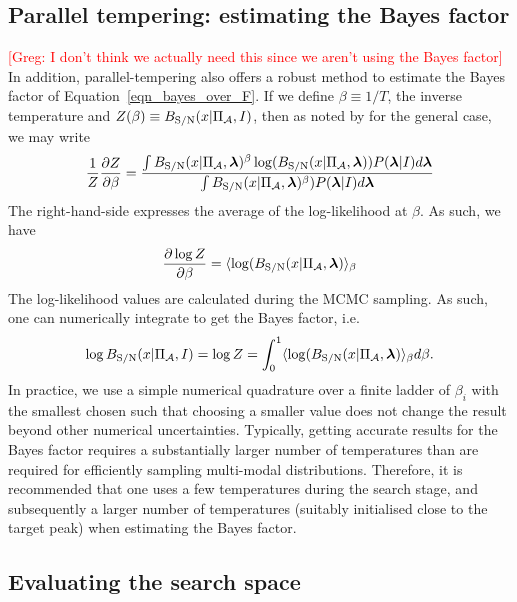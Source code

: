 \documentclass[aps, prd, twocolumn, superscriptaddress, floatfix, showpacs, nofootinbib, longbibliography]{revtex4-1}
\newcommand{\comment}[1]{\textcolor{red}{[#1]}}
\begin{document}
\subsection{Parallel tempering: estimating the Bayes factor}
\comment{Greg: I don't think we actually need this since we aren't using the Bayes factor}
In addition, parallel-tempering also offers a robust method to estimate the
Bayes factor of Equation~\eqref{eqn_bayes_over_F}. If we define
$\beta\equiv1/T$, the inverse temperature and $Z(\beta)\equiv B_{\rm S/N}(x| \Pi_\mathcal{A}, I)$, then as noted by \citet{goggans2004} for the general case, we may
write
\begin{align}
\frac{1}{Z} \frac{\partial Z}{\partial \beta}=
\frac{
\int B_{\rm S/N}(x| \Pi_\mathcal{A}, \boldsymbol{\mathbf{\lambda}})^{\beta}
\log(B_{\rm S/N}(x| \Pi_\mathcal{A}, \boldsymbol{\mathbf{\lambda}}))P(\boldsymbol{\mathbf{\lambda}}| I)
d\boldsymbol{\mathbf{\lambda}}
}
{
\int B_{\rm S/N}(x| \Pi_\mathcal{A}, \boldsymbol{\mathbf{\lambda}})^{\beta})P(\boldsymbol{\mathbf{\lambda}}| I)
d\boldsymbol{\mathbf{\lambda}}
}
\end{align}
The right-hand-side expresses the average of the log-likelihood at $\beta$. As
such, we have
\begin{align}
\frac{\partial \log Z}{\partial \beta} =
\langle \log(B_{\rm S/N}(x| \Pi_\mathcal{A}, \boldsymbol{\mathbf{\lambda}}) \rangle_{\beta}
\end{align}
The log-likelihood values are calculated during the MCMC sampling. As such, one
can numerically integrate to get the Bayes factor, i.e.
\begin{align}
\log B_{\rm S/N}(x| \Pi_\mathcal{A}, I) = \log Z = \int_{0}^{1}
\langle \log(B_{\rm S/N}(x| \Pi_\mathcal{A}, \boldsymbol{\mathbf{\lambda}}) \rangle_{\beta} d\beta.
\end{align}
In practice, we use a simple numerical quadrature over a finite ladder of
$\beta_i$ with the smallest chosen such that choosing a smaller value does not
change the result beyond other numerical uncertainties. Typically, getting
accurate results for the Bayes factor requires a substantially larger number of
temperatures than are required for efficiently sampling multi-modal
distributions.  Therefore, it is recommended that one uses a few
temperatures during the search stage, and subsequently a larger number of
temperatures (suitably initialised close to the target peak) when estimating
the Bayes factor.

\subsection{Evaluating the search space}
\end{document}
